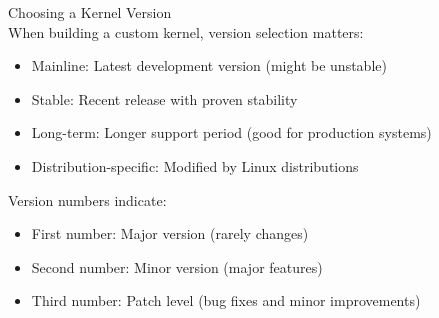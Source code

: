 \begin{definition}{Choosing a Kernel Version}\\
    When building a custom kernel, version selection matters:
    \begin{itemize}
        \item Mainline: Latest development version (might be unstable)
        \item Stable: Recent release with proven stability
        \item Long-term: Longer support period (good for production systems)
        \item Distribution-specific: Modified by Linux distributions
    \end{itemize}
    
    Version numbers indicate:
    \begin{itemize}
        \item First number: Major version (rarely changes)
        \item Second number: Minor version (major features)
        \item Third number: Patch level (bug fixes and minor improvements)
    \end{itemize}
\end{definition}

